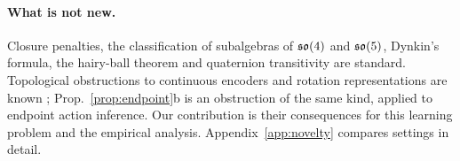 \paragraph{What is not new.}
Closure penalties, the classification of subalgebras of $\mathfrak{so}(4)$ and $\mathfrak{so}(5)$, Dynkin's formula, the hairy-ball
theorem and quaternion transitivity are standard. Topological obstructions to continuous encoders and rotation
representations are known \citep{dehaan2018topological,zhou2019continuity,bouchacourt2021addressing}; Prop.~\ref{prop:endpoint}b
is an obstruction of the same kind, applied to endpoint action inference. Our contribution is their consequences for this learning
problem and the empirical analysis. Appendix~\ref{app:novelty} compares settings in detail.
